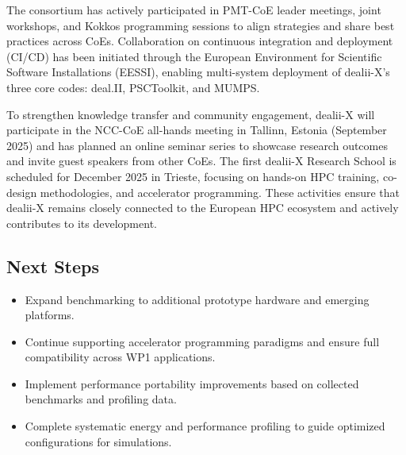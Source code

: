 \documentclass[a4paper,12pt, numbers]{article}
\begin{document}
The consortium has actively participated in PMT-CoE leader meetings, joint workshops, and Kokkos programming sessions to align strategies and share best practices across CoEs. Collaboration on continuous integration and deployment (CI/CD) has been initiated through the European Environment for Scientific Software Installations (EESSI), enabling multi-system deployment of dealii-X’s three core codes: deal.II, PSCToolkit, and MUMPS.

To strengthen knowledge transfer and community engagement, dealii-X will participate in the NCC-CoE all-hands meeting in Tallinn, Estonia (September 2025) and has planned an online seminar series to showcase research outcomes and invite guest speakers from other CoEs. The first dealii-X Research School is scheduled for December 2025 in Trieste, focusing on hands-on HPC training, co-design methodologies, and accelerator programming. These activities ensure that dealii-X remains closely connected to the European HPC ecosystem and actively contributes to its development.


\subsection{Next Steps} %
\begin{itemize}[left=1em, itemsep=0pt, topsep=0pt]
\item Expand benchmarking to additional prototype hardware and emerging platforms.
\item Continue supporting accelerator programming paradigms and ensure full compatibility across WP1 applications.
\item Implement performance portability improvements based on collected benchmarks and profiling data.
\item Complete systematic energy and performance profiling to guide optimized configurations for simulations.
\end{itemize}

\end{document}
